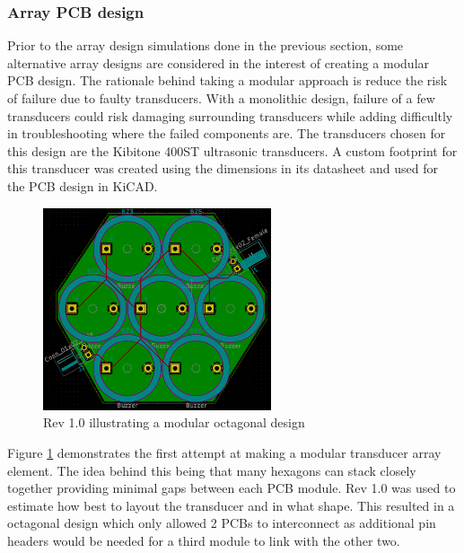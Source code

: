 \subsubsection{Array PCB design}
Prior to the array design simulations done in the previous section, some alternative array designs are considered in the interest of creating a modular PCB design. The rationale behind taking a modular approach is reduce the risk of failure due to faulty transducers. With a monolithic design, failure of a few transducers could risk damaging surrounding transducers while adding difficultly in troubleshooting where the failed components are. The transducers chosen for this design are the Kibitone 400ST ultrasonic transducers. A custom footprint for this transducer was created using the dimensions in its datasheet and used for the PCB design in KiCAD.

\begin{figure}[ht!]
    \centering
    \includegraphics[width=0.6\textwidth]{Figures/Design/PCB/closeups/octogonalrev1.png}
    \caption{Rev 1.0 illustrating a modular octagonal design}
    \label{fig:modHex1.0}
\end{figure}

Figure \ref{fig:modHex1.0} demonstrates the first attempt at making a modular transducer array element. The idea behind this being that many hexagons can stack closely together providing minimal gaps between each PCB module. Rev 1.0 was used to estimate how best to layout the transducer and in what shape. This resulted in a octagonal design which only allowed 2 PCBs to interconnect as additional pin headers would be needed for a third module to link with the other two.

